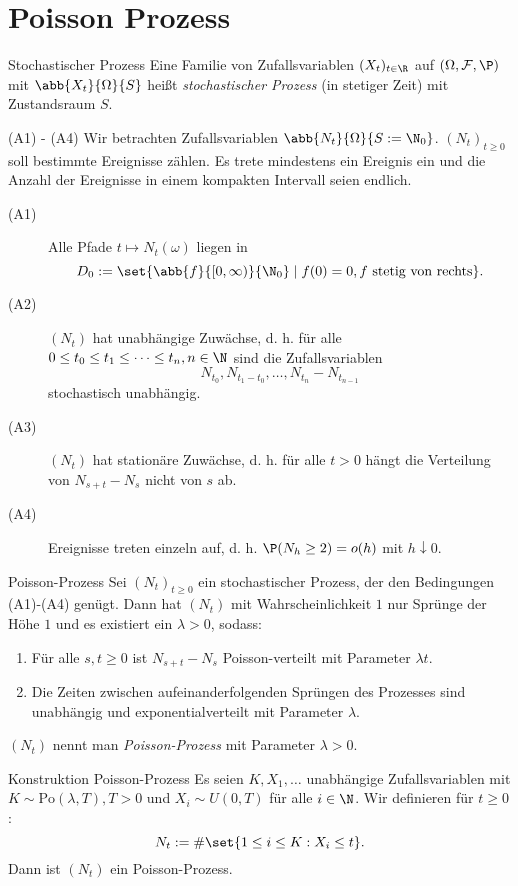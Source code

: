 \section{Poisson Prozess}

\begin{karte}{Stochastischer Prozess}
    Eine Familie von Zufallsvariablen \((X_t)_{t\in\R}\) auf 
    \( (\Omega, \mathcal{F}, \P) \) mit \( \abb{X_t}{\Omega}{S} \) 
    heißt \textit{stochastischer Prozess} (in stetiger Zeit) mit Zustandsraum \(S\).
\end{karte}

\begin{karte}{(A1) - (A4)}
    Wir betrachten Zufallsvariablen \( \abb{N_t}{\Omega}{S := \N_0} \).
    \((N_t)_{t\geq 0}\) soll bestimmte Ereignisse zählen. 
    Es trete mindestens ein Ereignis ein und die Anzahl der 
    Ereignisse in einem kompakten Intervall seien endlich.
    \begin{description}
        \item[(A1)] Alle Pfade \(t\mapsto N_t(\omega)\) liegen in 
        \[ D_0 := \set{\abb{f}{[0,\infty)}{\N_0} \;|\; f(0) = 0, f \text{ stetig von rechts} }. \]
        \item[(A2)] \( (N_t) \) hat unabhängige Zuwächse, d. h. für alle \(0\leq t_0 \leq t_1 \leq \cdots \leq t_n, n\in \N\)
        sind die Zufallsvariablen 
        \[ N_{t_0}, N_{t_1 - t_0}, \ldots, N_{t_n} - N_{t_{n-1}} \]
        stochastisch unabhängig.
        \item[(A3)] \((N_t)\) hat stationäre Zuwächse, d. h. für alle \(t>0\) 
        hängt die Verteilung von \(N_{s+t} - N_s\) nicht von \(s\) ab.
        \item[(A4)] Ereignisse treten einzeln auf, d. h. \( \P(N_h \geq 2) = o(h) \)
        mit \(h\downarrow 0\).  
    \end{description}
\end{karte}

\begin{karte}{Poisson-Prozess}
    Sei \( (N_t)_{t\geq 0} \) ein stochastischer Prozess, der den Bedingungen 
    (A1)-(A4) genügt. Dann hat \((N_t)\) mit Wahrscheinlichkeit \(1\) 
    nur Sprünge der Höhe \(1\) und es existiert ein \(\lambda > 0\), sodass: 
    \begin{enumerate}
        \item Für alle \(s,t\geq 0\) ist \( N_{s+t} - N_s \) 
        Poisson-verteilt mit Parameter \(\lambda t\).
        \item Die Zeiten zwischen aufeinanderfolgenden Sprüngen 
        des Prozesses sind unabhängig und exponentialverteilt mit Parameter \(\lambda\).
    \end{enumerate}
    \( (N_t) \) nennt man \textit{Poisson-Prozess} mit Parameter \(\lambda > 0\).
\end{karte}

\begin{karte}{Konstruktion Poisson-Prozess}
    Es seien \( K,X_1, \ldots \) unabhängige Zufallsvariablen mit \(K\sim \mathrm{Po}(\lambda,T), T>0\)
    und \(X_i \sim U(0,T)\) für alle \(i \in \N\). Wir definieren für \(t\geq 0\): 
    \[ N_t := \# \set{1\leq i \leq K : X_i \leq t}. \]
    Dann ist \((N_t)\) ein Poisson-Prozess.
\end{karte}